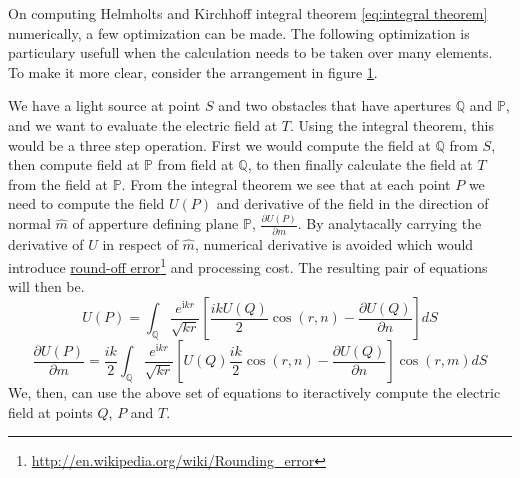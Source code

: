 \documentclass[12pt,twoside,english]{book}
\renewcommand{\~}{\perispomeni}%
\numberwithin{equation}{section}
\numberwithin{figure}{section}
\newcommand\fnurl[2]{%
 \href{#2}{#1}\footnote{\url{#2}}%
}
\begin{document}
On computing Helmholts and Kirchhoff integral theorem \ref{eq:integral theorem} numerically, a few optimization can be made. The following optimization is particulary usefull when the calculation needs to be taken over many elements. To make it more clear, consider the arrangement in figure \ref{fig:many diff el arr}. 
\begin{figure}[h]
\centering

\caption{}
\label{fig:many diff el arr}
\end{figure}
We have a light source at point $S$ and two obstacles that have apertures $\mathbb{Q}$ and $\mathbb{P}$, and we want to evaluate the electric field at $T$. Using the integral theorem, this would be a three step operation. First we would compute the field at $\mathbb{Q}$ from $S$, then compute field at $\mathbb{P}$ from field at $\mathbb{Q}$, to then finally calculate the field at $T$ from the field at $\mathbb{P}$. From the integral theorem we see that at each point $P$ we need to compute the field $U(P)$ and derivative of the field in the direction of normal $\hat{m}$ of apperture defining plane $\mathbb{P}$, $\frac{\partial U\left(P\right)}{\partial m}$. By analytacally carrying the derivative of $U$ in respect of $\hat{m}$, numerical derivative is avoided which would introduce \fnurl{round-off error}{http://en.wikipedia.org/wiki/Rounding_error} and processing cost. The resulting pair of equations will then be.
\begin{equation}
U\left(P\right)=\int_{\mathbb{Q}}\frac{e^{\text{i}kr}}{\sqrt{kr}}\left[\frac{ikU\left(Q\right)}{2}\cos\left(r,n\right)-\frac{\partial U\left(Q\right)}{\partial n}\right]dS\end{equation}
\begin{equation}
\frac{\partial U\left(P\right)}{\partial m}=\frac{ik}{2}\int_{\mathbb{Q}}\frac{e^{\text{i}kr}}{\sqrt{kr}}\left[U\left(Q\right)\frac{ik}{2}\cos\left(r,n\right)-\frac{\partial U\left(Q\right)}{\partial n}\right]\cos\left(r,m\right)dS\end{equation}
We, then, can use the above set of equations to iteractively compute the electric field at points $Q$, $P$ and $T$.
\end{document}
